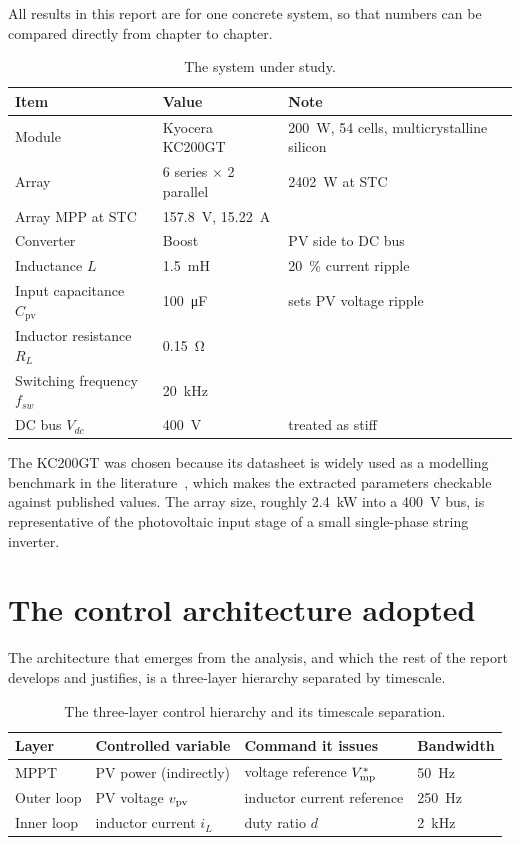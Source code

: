 All results in this report are for one concrete system, so that numbers can be
compared directly from chapter to chapter.

\begin{table}[htbp]
\centering
\caption{The system under study.}
\label{tab:system}
\begin{tabular}{@{}lll@{}}
\toprule
\textbf{Item} & \textbf{Value} & \textbf{Note} \\
\midrule
Module & Kyocera KC200GT & \SI{200}{\watt}, 54 cells, multicrystalline silicon \\
Array & 6 series $\times$ 2 parallel & \SI{2402}{\watt} at STC \\
Array MPP at STC & \SI{157.8}{\volt}, \SI{15.22}{\ampere} & \\
Converter & Boost & PV side to DC bus \\
Inductance $L$ & \SI{1.5}{\milli\henry} & \SI{20}{\percent} current ripple \\
Input capacitance $C_{\mathrm{pv}}$ & \SI{100}{\micro\farad} & sets PV voltage ripple \\
Inductor resistance $R_L$ & \SI{0.15}{\ohm} & \\
Switching frequency $f_{sw}$ & \SI{20}{\kilo\hertz} & \\
DC bus $V_{dc}$ & \SI{400}{\volt} & treated as stiff \\
\bottomrule
\end{tabular}
\end{table}

The KC200GT was chosen because its datasheet is widely used as a modelling
benchmark in the literature~\cite{villalva}, which makes the extracted
parameters checkable against published values. The array size, roughly
\SI{2.4}{\kilo\watt} into a \SI{400}{\volt} bus, is representative of the
photovoltaic input stage of a small single-phase string inverter.

\section{The control architecture adopted}

The architecture that emerges from the analysis, and which the rest of the
report develops and justifies, is a three-layer hierarchy separated by
timescale.

\begin{table}[htbp]
\centering
\caption{The three-layer control hierarchy and its timescale separation.}
\label{tab:hierarchy}
\begin{tabular}{@{}llll@{}}
\toprule
\textbf{Layer} & \textbf{Controlled variable} & \textbf{Command it issues} & \textbf{Bandwidth} \\
\midrule
MPPT & PV power (indirectly) & voltage reference $V_{\mathrm{mp}}^\ast$ & \SI{50}{\hertz} \\
Outer loop & PV voltage $v_{\mathrm{pv}}$ & inductor current reference & \SI{250}{\hertz} \\
Inner loop & inductor current $i_L$ & duty ratio $d$ & \SI{2}{\kilo\hertz} \\
\bottomrule
\end{tabular}
\end{table}

